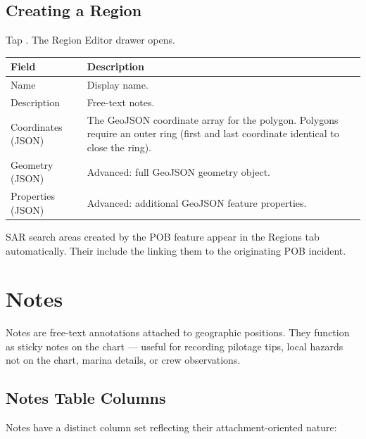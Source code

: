 \section{Creating a Region}

Tap . The Region Editor drawer opens.

\begin{longtable}{L{3cm} L{10.7cm}}
\toprule
{}
{\sffamily\bfseries\color{white} Field} &
{\sffamily\bfseries\color{white} Description} \\
\midrule
Name & Display name. \\
Description & Free-text notes. \\
Coordinates (JSON) & The GeoJSON coordinate array for the polygon. Polygons require an outer ring (first and last coordinate identical to close the ring). \\
Geometry (JSON) & Advanced: full GeoJSON geometry object. \\
Properties (JSON) & Advanced: additional GeoJSON feature properties. \\
\bottomrule
\end{longtable}

\begin{notebox}
SAR search areas created by the POB feature appear in the Regions tab automatically.
Their  include the  linking them to the originating POB incident.
\end{notebox}

\chapter{Notes}
\label{ch:notes}

Notes are free-text annotations attached to geographic positions.
They function as sticky notes on the chart --- useful for recording pilotage tips, local hazards not
on the chart, marina details, or crew observations.


\section{Notes Table Columns}

Notes have a distinct column set reflecting their attachment-oriented nature:

